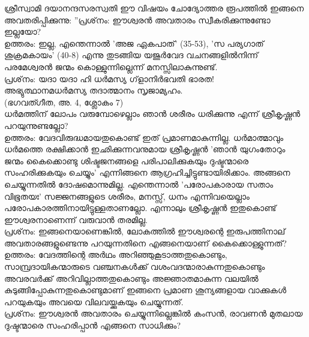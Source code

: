 ശ്രീസ്വാമി ദയാനന്ദസരസ്വതി ഈ വിഷയം ചോദ്യോത്തര രൂപത്തില്‍ ഇങ്ങനെ അവതരിപ്പിക്കുന്നു:
''പ്രശ്‌നം: ഈശ്വരന്‍ അവതാരം സ്വീകരിക്കുന്നുണ്ടോ ഇല്ലയോ?\\
ഉത്തരം: ഇല്ല, എന്തെന്നാല്‍ 'അജ ഏകപാത്' (35-53), 'സ പര്യഗാത് ശുക്രമകായം' (40-8) എന്നു തുടങ്ങിയ യജുര്‍വേദ വചനങ്ങളില്‍നിന്ന് പരമേശ്വരന്‍ ജന്മം കൊള്ളുന്നില്ലെന്ന് മനസ്സിലാകുന്നുണ്ട്.\\
പ്രശ്‌നം: യദാ യദാ ഹി ധര്‍മസ്യ ഗ്‌ളാനിര്‍ഭവതി ഭാരത!\\
അഭ്യുത്ഥാനമധര്‍മസ്യ തദാത്മാനം സൃജാമ്യഹം.\\
(ഭഗവത്ഗീത, അ. 4, ശ്ലോകം 7)\\

ധര്‍മത്തിന് ലോപം വരുമ്പോഴെല്ലാം ഞാന്‍ ശരീരം ധരിക്കുന്നു എന്ന് ശ്രീകൃഷ്ണന്‍ പറയുന്നുണ്ടല്ലോ?\\
ഉത്തരം: വേദവിരുദ്ധമായതുകൊണ്ട് ഇത് പ്രമാണമാകുന്നില്ല. ധര്‍മാത്മാവും ധര്‍മത്തെ രക്ഷിക്കാന്‍ ഇഛിക്കുന്നവനുമായ ശ്രീകൃഷ്ണന്‍ 'ഞാന്‍ യുഗംതോറും ജന്മം കൈക്കൊണ്ടു ശിഷ്ടജനങ്ങളെ പരിപാലിക്കുകയും ദുഷ്ടന്മാരെ സംഹരിക്കുകയും ചെയ്യും' എന്നിങ്ങനെ ആഗ്രഹിച്ചിട്ടുണ്ടായിരിക്കാം. അങ്ങനെ ചെയ്യുന്നതില്‍ ദോഷമൊന്നുമില്ല. എന്തെന്നാല്‍ 'പരോപകാരായ സതാം വിഭൂതയഃ' സജ്ജനങ്ങളുടെ ശരീരം, മനസ്സ്, ധനം എന്നിവയെല്ലാം പരോപകാരത്തിനായിട്ടുള്ളതാണല്ലോ. എന്നാലും ശ്രീകൃഷ്ണന്‍ ഇതുകൊണ്ട് ഈശ്വരനാണെന്ന് വരുവാന്‍ തരമില്ല.\\
പ്രശ്‌നം: ഇങ്ങനെയാണെങ്കില്‍, ലോകത്തില്‍ ഈശ്വരന്റെ ഇരുപത്തിനാല് അവതാരങ്ങളുണ്ടെന്നു പറയുന്നതിനെ എങ്ങനെയാണ് കൈക്കൊള്ളുന്നത്?\\
ഉത്തരം: വേദത്തിന്റെ അര്‍ഥം അറിഞ്ഞുകൂടാത്തതുകൊണ്ടും, സാമ്പ്രദായികന്മാരുടെ വഞ്ചനകള്‍ക്ക് വശംവദന്മാരാകുന്നതുകൊണ്ടും അവരവര്‍ക്ക് അറിവില്ലാത്തതുകൊണ്ടും അജ്ഞാതമാകുന്ന വലയില്‍ കുടുങ്ങിപ്പോകുന്നതുകൊണ്ടുമാണ് ഇങ്ങനെ പ്രമാണ ശൂന്യങ്ങളായ വാക്കുകള്‍ പറയുകയും അവയെ വിലവയ്ക്കുകയും ചെയ്യുന്നത്.\\
പ്രശ്‌നം: ഈശ്വരന്‍ അവതാരം ചെയ്യുന്നില്ലെങ്കില്‍ കംസന്‍, രാവണന്‍ മുതലായ ദുഷ്ടന്മാരെ സംഹരിപ്പാന്‍ എങ്ങനെ സാധിക്കും?\\
